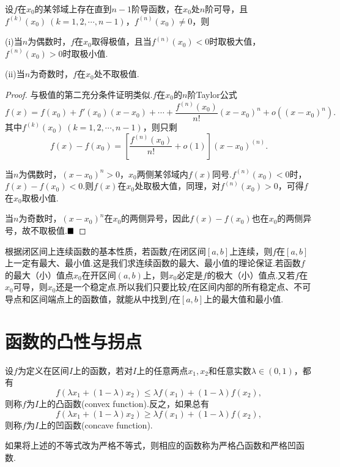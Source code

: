 \begin{theorem}[极值的第三充分条件]
	设$f$在$x_0$的某邻域上存在直到$n-1$阶导函数，在$x_0$处$n$阶可导，且$f^{(k)}(x_0)\ (k=1,2,\cdots,n-1)$，$f^{(n)}(x_0)\neq 0$，则
	
	(i)当$n$为偶数时，$f$在$x_0$取得极值，且当$f^{(n)}(x_0)<0$时取极大值，$f^{(n)}(x_0)>0$时取极小值.
	
	(ii)当$n$为奇数时，$f$在$x_0$处不取极值.
\end{theorem}
\begin{proof}
	与极值的第二充分条件证明类似.$f$在$x_0$的$n$阶Taylor公式
	$$f(x)=f(x_0)+f'(x_0)(x-x_0)+\cdots+\frac{f^{(n)}(x_0)}{n!}(x-x_0)^{n}+o((x-x_0)^n).$$
	其中$f^{(k)}(x_0)\ (k=1,2,\cdots,n-1)$，则只剩
	$$f(x)-f(x_0)=\left[\frac{f^{(n)}(x_0)}{n!}+o(1)\right](x-x_0)^{(n)}.$$
	
	当$n$为偶数时，$(x-x_0)^n>0$，$x_0$两侧某邻域内$f(x)$同号.$f^{(n)}(x_0)<0$时，$f(x)-f(x_0)<0$.则$f(x)$在$x_0$处取极大值，同理，对$f^{(n)}(x_0)>0$，可得$f$在$x_0$取极小值.
	
	当$n$为奇数时，$(x-x_0)^n$在$x_0$的两侧异号，因此$f(x)-f(x_0)$也在$x_0$的两侧异号，故不取极值.$\hfill\blacksquare$
\end{proof}

根据闭区间上连续函数的基本性质，若函数$f$在闭区间$\left[a,b\right]$上连续，则$f$在$\left[a,b\right]$上一定有最大、最小值.这是我们求连续函数的最大、最小值的理论保证.若函数$f$的最大（小）值点$x_0$在开区间$(a,b)$上，则$x_0$必定是$f$的极大（小）值点.又若$f$在$x_0$可导，则$x_0$还是一个稳定点.所以我们只要比较$f$在区间内部的所有稳定点、不可导点和区间端点上的函数值，就能从中找到$f$在$\left[a,b\right]$上的最大值和最小值.
\section{函数的凸性与拐点}
\begin{definition}[凸函数和凹函数]
	设$f$为定义在区间$I$上的函数，若对$I$上的任意两点$x_1,x_2$和任意实数$\lambda\in(0,1)$，都有
	$$f(\lambda x_1+(1-\lambda)x_2)\leqslant\lambda f(x_1)+(1-\lambda)f(x_2),$$
	则称$f$为$I$上的{\heiti 凸函数}(convex function).反之，如果总有
	$$f(\lambda x_1+(1-\lambda)x_2)\geqslant\lambda f(x_1)+(1-\lambda)f(x_2),$$
	则称$f$为$I$上的{\heiti 凹函数}(concave function).
\end{definition}
如果将上述的不等式改为严格不等式，则相应的函数称为{\heiti 严格凸函数}和{\heiti 严格凹函数}.

